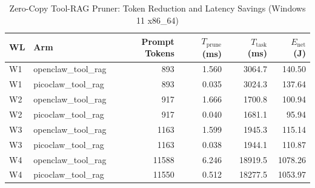 \begin{table}[t]
\centering\small
\caption{Zero-Copy Tool-RAG Pruner: Token Reduction and Latency Savings (Windows 11 x86_64)}
\label{tab:Windows_tool_rag}
\begin{tabular}{llrrrr}
\toprule
WL & Arm & Prompt Tokens & $T_{\text{prune}}$ (ms) & $T_{\text{task}}$ (ms) & $E_{\text{net}}$ (J) \\
\midrule
W1 & openclaw\_tool\_rag & 893 & 1.560 & 3064.7 & 140.50 \\
W1 & picoclaw\_tool\_rag & 893 & 0.035 & 3024.3 & 137.64 \\
W2 & openclaw\_tool\_rag & 917 & 1.666 & 1700.8 & 100.94 \\
W2 & picoclaw\_tool\_rag & 917 & 0.040 & 1681.1 & 95.94 \\
W3 & openclaw\_tool\_rag & 1163 & 1.599 & 1945.3 & 115.14 \\
W3 & picoclaw\_tool\_rag & 1163 & 0.038 & 1944.1 & 110.87 \\
W4 & openclaw\_tool\_rag & 11588 & 6.246 & 18919.5 & 1078.26 \\
W4 & picoclaw\_tool\_rag & 11550 & 0.512 & 18277.5 & 1053.97 \\
\bottomrule
\end{tabular}
\end{table}
